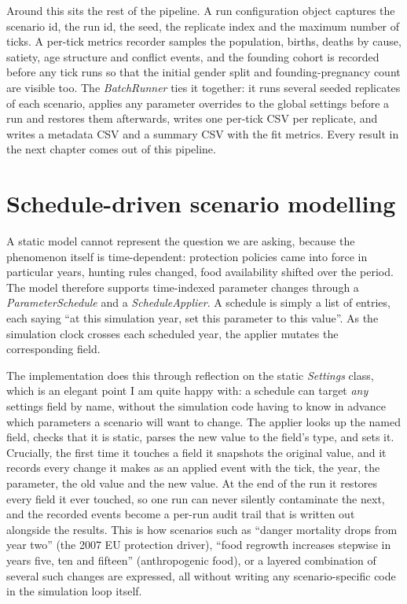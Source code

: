 Around this sits the rest of the pipeline. A run configuration object captures the scenario id, the run id, the seed, the replicate index and the maximum number of ticks. A per-tick metrics recorder samples the population, births, deaths by cause, satiety, age structure and conflict events, and the founding cohort is recorded before any tick runs so that the initial gender split and founding-pregnancy count are visible too. The \emph{BatchRunner} ties it together: it runs several seeded replicates of each scenario, applies any parameter overrides to the global settings before a run and restores them afterwards, writes one per-tick CSV per replicate, and writes a metadata CSV and a summary CSV with the fit metrics. Every result in the next chapter comes out of this pipeline.

\section{Schedule-driven scenario modelling}

A static model cannot represent the question we are asking, because the phenomenon itself is time-dependent: protection policies came into force in particular years, hunting rules changed, food availability shifted over the period. The model therefore supports time-indexed parameter changes through a \emph{ParameterSchedule} and a \emph{ScheduleApplier}. A schedule is simply a list of entries, each saying ``at this simulation year, set this parameter to this value''. As the simulation clock crosses each scheduled year, the applier mutates the corresponding field.

The implementation does this through reflection on the static \emph{Settings} class, which is an elegant point I am quite happy with: a schedule can target \emph{any} settings field by name, without the simulation code having to know in advance which parameters a scenario will want to change. The applier looks up the named field, checks that it is static, parses the new value to the field's type, and sets it. Crucially, the first time it touches a field it snapshots the original value, and it records every change it makes as an applied event with the tick, the year, the parameter, the old value and the new value. At the end of the run it restores every field it ever touched, so one run can never silently contaminate the next, and the recorded events become a per-run audit trail that is written out alongside the results. This is how scenarios such as ``danger mortality drops from year two'' (the 2007 EU protection driver), ``food regrowth increases stepwise in years five, ten and fifteen'' (anthropogenic food), or a layered combination of several such changes are expressed, all without writing any scenario-specific code in the simulation loop itself.

